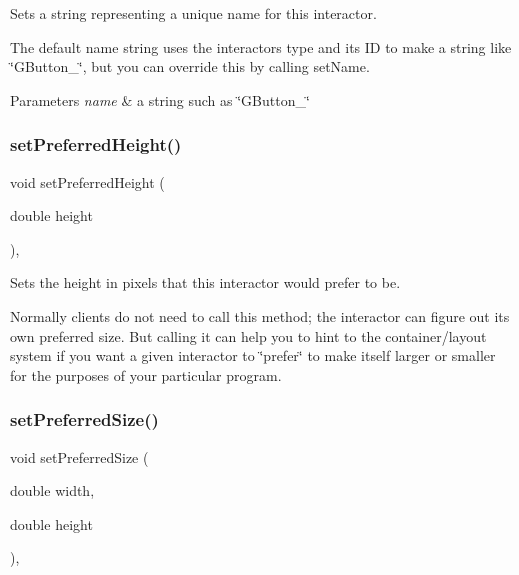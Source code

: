 Sets a string representing a unique name for this interactor. 

The default name string uses the interactor\textquotesingle{}s type and its ID to make a string like \char`\"{}\+G\+Button\+\_\char`\"{}, but you can override this by calling set\+Name. 
\begin{DoxyParams}{Parameters}
{\em name} & a string such as \char`\"{}\+G\+Button\+\_\char`\"{} \\
\hline
\end{DoxyParams}
\mbox{\label{classGInteractor_a1ab987704fce32098706c6f00fb08218}} 
\subsubsection{\texorpdfstring{set\+Preferred\+Height()}{setPreferredHeight()}}
{\footnotesize\ttfamily void set\+Preferred\+Height (\begin{DoxyParamCaption}\item[{double}]{height }\end{DoxyParamCaption})\hspace{0.3cm}{\ttfamily [virtual]}, {\ttfamily [inherited]}}



Sets the height in pixels that this interactor would prefer to be. 

Normally clients do not need to call this method; the interactor can figure out its own preferred size. But calling it can help you to hint to the container/layout system if you want a given interactor to \char`\"{}prefer\char`\"{} to make itself larger or smaller for the purposes of your particular program. \mbox{\label{classGInteractor_a042c5ae19430d765ef552371cae3632c}} 
\subsubsection{\texorpdfstring{set\+Preferred\+Size()}{setPreferredSize()}\hspace{0.1cm}{\footnotesize\ttfamily [1/2]}}
{\footnotesize\ttfamily void set\+Preferred\+Size (\begin{DoxyParamCaption}\item[{double}]{width,  }\item[{double}]{height }\end{DoxyParamCaption})\hspace{0.3cm}{\ttfamily [virtual]}, {\ttfamily [inherited]}}



